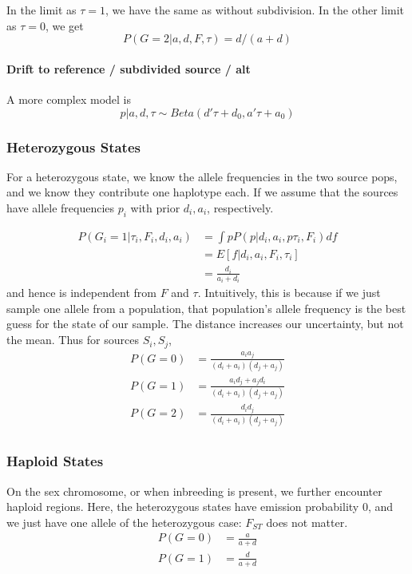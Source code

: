 \documentclass[10pt,a4paper]{article}
\begin{document}
In the limit as $\tau=1$, we have the same as without subdivision. In the 
other limit as $\tau=0$, we get
\begin{equation}
P(G=2|a, d, F, \tau) = d / (a+d)
\end{equation}

\paragraph{Drift to reference / subdivided source / alt}
A more complex model is
\begin{equation}
p| a, d, \tau \sim Beta (d'\tau + d_0, a'\tau + a_0)
\end{equation}




\subsubsection{Heterozygous States}
For a heterozygous state, we know the allele frequencies in the two source pops, and we know they contribute one haplotype each. If we assume that the sources have allele frequencies $p_i$ with prior $d_i, a_i$, respectively.

\begin{align}
P(G_i = 1 | \tau_i, F_i, d_i, a_i) &=  \int p P(p| d_i, a_i, p \tau_i, F_i) df\nonumber\\
&= E[f| d_i, a_i, F_i, \tau_i]\nonumber\\
&=\frac{d_i}{a_i+d_i}\label{eq:ll:het}
\end{align}
and hence is independent from $F$ and $\tau$. Intuitively, this is because if we just sample one allele from a population, that population's allele frequency is the best guess for the state of our sample. The distance increases our uncertainty, but not the mean.
Thus for sources $S_i, S_j$, 
\begin{align*}
P(G=0) &= \frac{a_i a_j}{(d_i+a_i)(d_j+a_j)}\\
P(G=1) &= \frac{a_id_j + a_jd_i}{(d_i+a_i)(d_j+a_j)}\\
P(G=2) &= \frac{d_i d_j}{(d_i+a_i)(d_j+a_j)}\\
\end{align*}



\subsubsection{Haploid States}
On the sex chromosome, or when inbreeding is present, we further encounter haploid regions. Here, the heterozygous states have emission probability 0, and we just have one allele of the heterozygous case: $F_{ST}$ does not matter.
\begin{align}
P(G=0) &= \frac{a}{a+d}\nonumber\\
P(G=1) &= \frac{d}{a+d}\label{eq:ll:hap}
\end{align}
\end{document}
